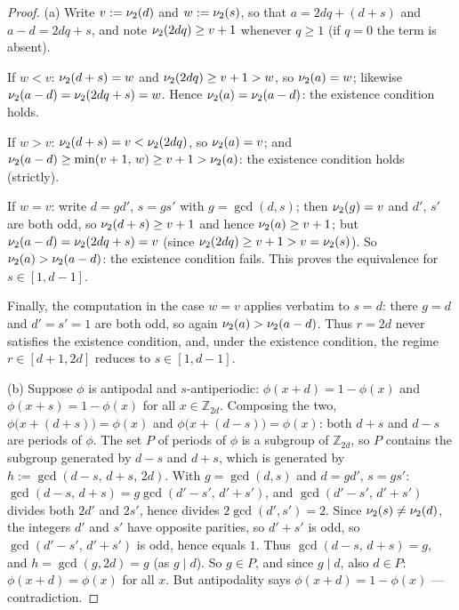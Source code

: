 \begin{proof}
(a) Write $v := \nu_2(d)$ and $w := \nu_2(s)$, so that $a = 2dq + (d + s)$
and $a - d = 2dq + s$, and note $\nu_2(2dq) \ge v + 1$ whenever $q \ge 1$
(if $q = 0$ the term is absent).

If $w < v$: $\nu_2(d + s) = w$ and $\nu_2(2dq) \ge v + 1 > w$, so
$\nu_2(a) = w$; likewise $\nu_2(a - d) = \nu_2(2dq + s) = w$. Hence
$\nu_2(a) = \nu_2(a - d)$: the existence condition holds.

If $w > v$: $\nu_2(d + s) = v < \nu_2(2dq)$, so $\nu_2(a) = v$; and
$\nu_2(a - d) \ge \min(v + 1,\, w) \ge v + 1 > \nu_2(a)$: the existence
condition holds (strictly).

If $w = v$: write $d = g d'$, $s = g s'$ with $g = \gcd(d, s)$; then
$\nu_2(g) = v$ and $d'$, $s'$ are both odd, so $\nu_2(d + s) \ge v + 1$
and hence $\nu_2(a) \ge v + 1$; but
$\nu_2(a - d) = \nu_2(2dq + s) = v$ (since
$\nu_2(2dq) \ge v + 1 > v = \nu_2(s)$). So $\nu_2(a) > \nu_2(a - d)$: the
existence condition fails. This proves the equivalence for
$s \in [1, d-1]$.

Finally, the computation in the case $w = v$ applies verbatim to $s = d$:
there $g = d$ and $d' = s' = 1$ are both odd, so again
$\nu_2(a) > \nu_2(a - d)$. Thus $r = 2d$ never satisfies the existence
condition, and, under the existence condition, the regime
$r \in [d+1, 2d]$ reduces to $s \in [1, d-1]$.

(b) Suppose $\phi$ is antipodal and $s$-antiperiodic:
$\phi(x + d) = 1 - \phi(x)$ and $\phi(x + s) = 1 - \phi(x)$ for all
$x \in \mathbb{Z}_{2d}$. Composing the two,
$\phi\bigl(x + (d + s)\bigr) = \phi(x)$ and
$\phi\bigl(x + (d - s)\bigr) = \phi(x)$: both $d + s$ and $d - s$ are
periods of $\phi$. The set $P$ of periods of $\phi$ is a subgroup of
$\mathbb{Z}_{2d}$, so $P$ contains the subgroup generated by $d - s$ and
$d + s$, which is generated by $h := \gcd(d - s,\, d + s,\, 2d)$. With
$g = \gcd(d, s)$ and $d = g d'$, $s = g s'$:
$\gcd(d - s,\, d + s) = g \gcd(d' - s',\, d' + s')$, and
$\gcd(d' - s',\, d' + s')$ divides both $2d'$ and $2s'$, hence divides
$2 \gcd(d', s') = 2$. Since $\nu_2(s) \ne \nu_2(d)$, the integers $d'$ and
$s'$ have opposite parities, so $d' + s'$ is odd, so
$\gcd(d' - s',\, d' + s')$ is odd, hence equals $1$. Thus
$\gcd(d - s,\, d + s) = g$, and $h = \gcd(g, 2d) = g$ (as $g \mid d$). So
$g \in P$, and since $g \mid d$, also $d \in P$: $\phi(x + d) = \phi(x)$
for all $x$. But antipodality says $\phi(x + d) = 1 - \phi(x)$ ---
contradiction.
\end{proof}

